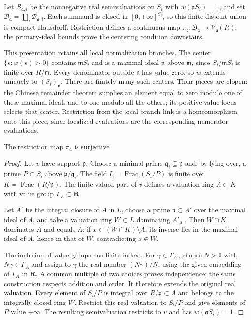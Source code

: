 Let $\mathcal B_{\mathfrak a,i}$ be the nonnegative real semivaluations
on $S_i$ with $w(\mathfrak aS_i)=1$, and set
$\mathcal B_{\mathfrak a}=\coprod_i\mathcal B_{\mathfrak a,i}$.
Each summand is closed in $[0,+\infty]^{S_i}$, so this finite disjoint
union is compact Hausdorff. Restriction defines a continuous map
$\pi_{\mathfrak a}:\mathcal B_{\mathfrak a}\to
\mathcal V_{\mathfrak a}(R)$; the primary-ideal bounds prove the
centering condition downstairs.

This presentation retains all local normalization branches. The center
$\{s:w(s)>0\}$ contains $\mathfrak mS_i$ and is a maximal ideal
$\mathfrak n$ above $\mathfrak m$, since $S_i/\mathfrak mS_i$ is
finite over $R/\mathfrak m$. Every denominator outside $\mathfrak n$
has value zero, so $w$ extends uniquely to $(S_i)_{\mathfrak n}$.
There are finitely many such centers. Their pieces are clopen:
the Chinese remainder theorem supplies an element equal to zero modulo
one of these maximal ideals and to one modulo all the others; its
positive-value locus selects that center. Restriction from the local
branch link is a homeomorphism onto this piece, since localized
evaluations are the corresponding numerator evaluations.

\begin{lemma}\label{lem:p121-normalization-semivaluation-lift}
The restriction map $\pi_{\mathfrak a}$ is surjective.
\end{lemma}

\begin{proof}
Let $v$ have support $\mathfrak p$. Choose a minimal prime
$\mathfrak q_i\subseteq\mathfrak p$ and, by lying over, a prime
$P\subset S_i$ above $\mathfrak p/\mathfrak q_i$.
The field $L=\operatorname{Frac}(S_i/P)$ is finite over
$K=\operatorname{Frac}(R/\mathfrak p)$. The finite-valued part of
$v$ defines a valuation ring $A\subset K$ with value group
$\Gamma_A\subset\mathbf R$.

Let $A'$ be the integral closure of $A$ in $L$, choose a prime
$\mathfrak n\subset A'$ over the maximal ideal of $A$, and take
a valuation ring $W\subset L$ dominating $A'_{\mathfrak n}$
\cite[Tag 00IA]{StacksProject}. Then $W\cap K$ dominates $A$
and equals $A$: if $x\in(W\cap K)\setminus A$, its inverse
lies in the maximal ideal of $A$, hence in that of $W$, contradicting
$x\in W$.

The inclusion of value groups has finite index
\cite[Tag 0ASH]{StacksProject}. For $\gamma\in\Gamma_W$, choose
$N>0$ with $N\gamma\in\Gamma_A$ and assign to $\gamma$ the real
number $(N\gamma)/N$, using the given embedding of $\Gamma_A$
in $\mathbf R$. A common multiple of two choices proves independence;
the same construction respects addition and order. It therefore extends
the original real valuation. Every element of $S_i/P$ is integral
over $R/\mathfrak p\subset A$ and belongs to the integrally closed
ring $W$. Restrict this real valuation to $S_i/P$ and give elements
of $P$ value $+\infty$. The resulting semivaluation restricts to
$v$ and has $w(\mathfrak aS_i)=1$.
\end{proof}

